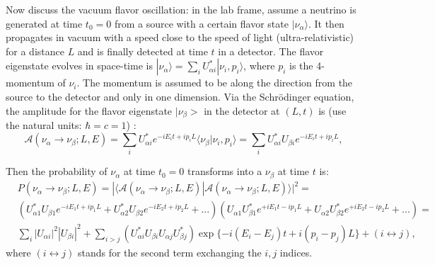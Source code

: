 Now discuss the vacuum flavor oscillation: in the lab frame, assume a neutrino is generated at time $t_0=0$ from a source with a certain flavor state $|\nu_\alpha\rangle$. It then propagates in vacuum with a speed close to the speed of light (ultra-relativistic) for a distance $L$ and is finally detected at time $t$ in a detector. The flavor eigenstate evolves in space-time is $|\nu_\alpha \rangle = \sum_i U^*_{\alpha i}|\nu_i,p_i\rangle$, where $p_i$ is the 4-momentum of $\nu_i$. The momentum is assumed to be along the direction from the source to the detector and only in one dimension. Via the Schr\"{o}dinger equation, the amplitude for the flavor eigenstate $|\nu_\beta>$ in the detector at $(L,t)$ is (use the natural units: $\hbar=c=1$) \cite{aitchison2012gauge}:
\begin{equation}
\mathcal{A}(\nu_\alpha\to\nu_\beta;L,E)=\sum_{i}U^*_{\alpha i}e^{-iE_i t+ip_iL}\langle\nu_\beta|\nu_i,p_i\rangle=\sum_{i}U^*_{\alpha i}U_{\beta i}e^{-iE_it+ip_iL},
\end{equation}

Then the probability of $\nu_\alpha$ at time $t_0=0$ transforms into a $\nu_\beta$ at time $t$ is:
\begin{equation}\label{oscillationEq1}
 \begin{split}
&P(\nu_\alpha\to\nu_\beta;L,E)=|\langle\mathcal{A}(\nu_\alpha\to\nu_\beta;L,E)|\mathcal{A}(\nu_\alpha\to\nu_\beta;L,E)\rangle|^2=\\
&(U^*_{\alpha 1}U_{\beta 1}e^{-iE_1t+ip_1L}+U^*_{\alpha 2}U_{\beta 2}e^{-iE_2t+ip_2L}+...)(U_{\alpha 1}U^*_{\beta 1}e^{+iE_1t-ip_1L}+U_{\alpha 2}U^*_{\beta 2}e^{+iE_2t-ip_2L}+...)=\\
&\sum_i |U_{\alpha i}|^2|U_{\beta i}|^2 + \sum_{i>j}(U^*_{\alpha i}U_{\beta i}U_{\alpha j}U^*_{\beta j})\exp\{-i(E_i-E_j)t+i(p_i-p_j)L\}+(i\leftrightarrow j),
\end{split}
\end{equation}
where $(i\leftrightarrow j)$ stands for the second term exchanging the $i,j$ indices.

